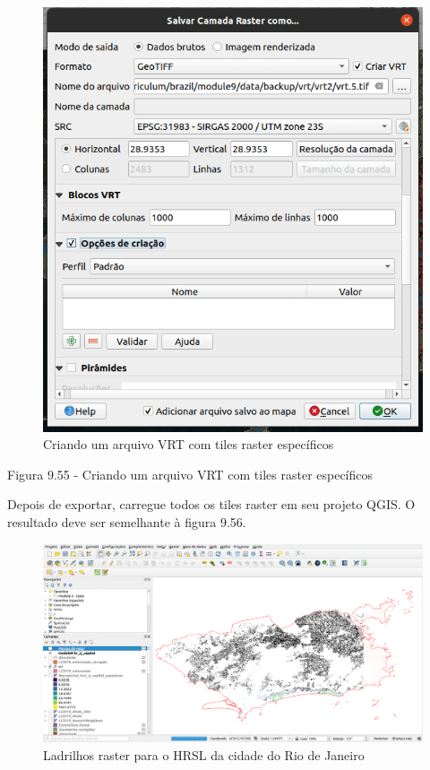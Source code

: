 \documentclass[
]{krantz}
\begin{document}
\begin{figure}
\centering
\includegraphics{media/modulo9/fig955.png}
\caption{Criando um arquivo VRT com tiles raster específicos}
\end{figure}

Figura 9.55 - Criando um arquivo VRT com tiles raster específicos

Depois de exportar, carregue todos os tiles raster em seu projeto QGIS. O resultado deve ser semelhante à figura 9.56.

\begin{figure}
\centering
\includegraphics{media/modulo9/fig956.png}
\caption{Ladrilhos raster para o HRSL da cidade do Rio de Janeiro}
\end{figure}
\end{document}
